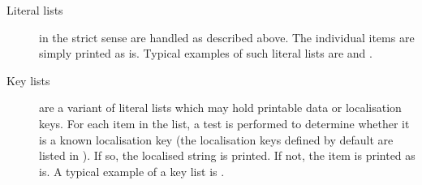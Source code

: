 \documentclass{ltxdockit}[2011/03/25]
\begin{document}
\begin{description}
\begin{description}

\item[Literal lists] in the strict sense are handled as described above. The individual items are simply printed as is. Typical examples of such literal lists are  and .

\item[Key lists] are a variant of literal lists which may hold printable data or localisation keys. For each item in the list, a test is performed to determine whether it is a known localisation key (the localisation keys defined by default are listed in ). If so, the localised string is printed. If not, the item is printed as is. A typical example of a key list is .

\end{description}
\end{description}
\end{document}
